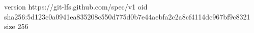 version https://git-lfs.github.com/spec/v1
oid sha256:5d123c0a0941ea835208c550d775d0b7e44aebfa2c2a8cf4114dc967bf9c8321
size 256
